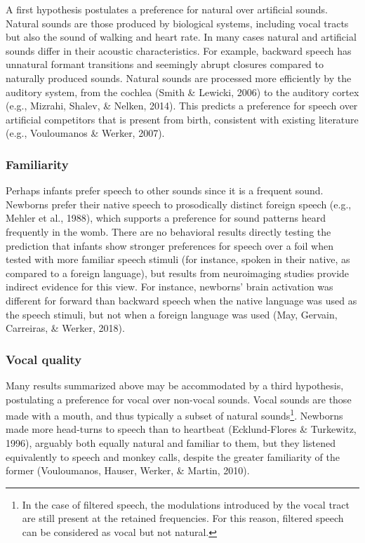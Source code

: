 \documentclass[man,floatsintext]{apa6}
\let\rmarkdownfootnote\footnote%
\def\footnote{\protect\rmarkdownfootnote}
\begin{document}
A first hypothesis postulates a preference for natural over artificial
sounds. Natural sounds are those produced by biological systems,
including vocal tracts but also the sound of walking and heart rate. In
many cases natural and artificial sounds differ in their acoustic
characteristics. For example, backward speech has unnatural formant
transitions and seemingly abrupt closures compared to naturally produced
sounds. Natural sounds are processed more efficiently by the auditory
system, from the cochlea (Smith \& Lewicki, 2006) to the auditory cortex
(e.g., Mizrahi, Shalev, \& Nelken, 2014). This predicts a preference for
speech over artificial competitors that is present from birth,
consistent with existing literature (e.g., Vouloumanos \& Werker, 2007).

\subsubsection{Familiarity}\label{familiarity}

Perhaps infants prefer speech to other sounds since it is a frequent
sound. Newborns prefer their native speech to prosodically distinct
foreign speech (e.g., Mehler et al., 1988), which supports a preference
for sound patterns heard frequently in the womb. There are no behavioral
results directly testing the prediction that infants show stronger
preferences for speech over a foil when tested with more familiar speech
stimuli (for instance, spoken in their native, as compared to a foreign
language), but results from neuroimaging studies provide indirect
evidence for this view. For instance, newborns' brain activation was
different for forward than backward speech when the native language was
used as the speech stimuli, but not when a foreign language was used
(May, Gervain, Carreiras, \& Werker, 2018).

\subsubsection{Vocal quality}\label{vocal-quality}

Many results summarized above may be accommodated by a third hypothesis,
postulating a preference for vocal over non-vocal sounds. Vocal sounds
are those made with a mouth, and thus typically a subset of natural
sounds\footnote{In the case of filtered speech, the modulations
  introduced by the vocal tract are still present at the retained
  frequencies. For this reason, filtered speech can be considered as
  vocal but not natural.}. Newborns made more head-turns to speech than
to heartbeat (Ecklund-Flores \& Turkewitz, 1996), arguably both equally
natural and familiar to them, but they listened equivalently to speech
and monkey calls, despite the greater familiarity of the former
(Vouloumanos, Hauser, Werker, \& Martin, 2010).
\end{document}
